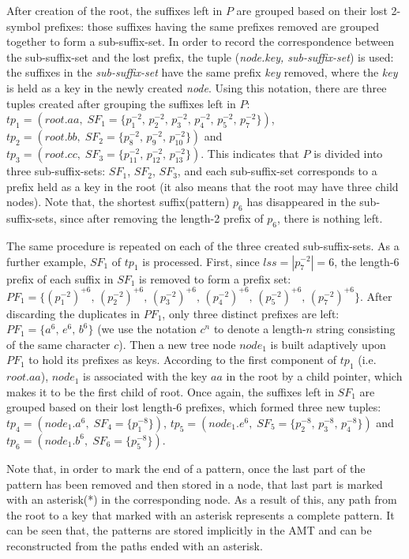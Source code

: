 After creation of the root, the suffixes left in $P$ are grouped based
on their lost 2-symbol prefixes: those suffixes having the same
prefixes removed are grouped together to form a sub-suffix-set. In
order to record the correspondence between the sub-suffix-set and the
lost prefix, the tuple (\emph{node.key,\; sub-suffix-set}) is used:
the suffixes in the \emph{sub-suffix-set} have the same prefix
\emph{key} removed, where the \emph{key} is held as a key in the newly
created \emph{node}. Using this notation, there are three tuples
created after grouping the suffixes left in $P$:
$tp_1 = (root.aa,\; SF_1=\{p_1^{-2},\, p_2^{-2},\, p_3^{-2},\,
p_4^{-2},\, p_5^{-2},\, p_7^{-2}\})$,\,
$tp_2 = (root.bb,\; SF_2=\{p_8^{-2},\, p_9^{-2},\, p_{10}^{-2}\})$ and
$tp_3 = (root.cc,\; SF_3=\{p_{11}^{-2},\, p_{12}^{-2},\,
p_{13}^{-2}\})$. This indicates that $P$ is divided into three
sub-suffix-sets: $SF_1$, $SF_2$, $SF_3$, and each sub-suffix-set
corresponds to a prefix held as a key in the root (it also means that
the root may have three child nodes). Note that, the shortest
suffix(pattern) $p_6$ has disappeared in the sub-suffix-sets, since
after removing the length-2 prefix of $p_6$, there is nothing left.

The same procedure is repeated on each of the three created
sub-suffix-sets. As a further example, $SF_1$ of $tp_1$ is
processed. First, since $lss = |p_7^{-2}| = 6$, the length-$6$ prefix
of each suffix in $SF_1$ is removed to form a prefix set:
$PF_1 = \{(p_1^{-2})^{+6},\, (p_2^{-2})^{+6},\, (p_3^{-2})^{+6},\,
(p_4^{-2})^{+6},\, (p_5^{-2})^{+6},\, (p_7^{-2})^{+6}\}$. After
discarding the duplicates in $PF_1$, only three distinct prefixes are
left: $PF_1 = \{a^6,\, e^6,\, b^6\}$ (we use the notation $c^n$ to
denote a length-$n$ string consisting of the same character $c$).
Then a new tree node $node_1$ is built adaptively upon $PF_1$ to hold
its prefixes as keys.  According to the first component of $tp_1$
(i.e. $root.aa$), $node_1$ is associated with the key $aa$ in the root
by a child pointer, which makes it to be the first child of root. Once
again, the suffixes left in $SF_1$ are grouped based on their lost
length-6 prefixes, which formed three new tuples:
$tp_4 = (node_1.a^6,\; SF_4=\{p_1^{-8}\})$,
$tp_5 = (node_1.e^6,\; SF_5=\{p_2^{-8},\, p_3^{-8},\, p_4^{-8}\})$ and
$tp_6 = (node_1.b^6,\; SF_6=\{p_5^{-8}\})$.

Note that, in order to mark the end of a pattern, once the last part
of the pattern has been removed and then stored in a node, that last
part is marked with an asterisk(*) in the corresponding node. As a
result of this, any path from the root to a key that marked with an
asterisk represents a complete pattern. It can be seen that, the
patterns are stored implicitly in the AMT and can be reconstructed
from the paths ended with an asterisk.

